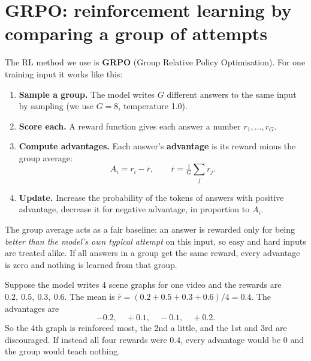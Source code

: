 \documentclass[11pt,openany]{book}
\begin{document}
\section{GRPO: reinforcement learning by comparing a group of attempts}\label{sec:grpo}
The RL method we use is \textbf{GRPO} (Group Relative Policy Optimisation). For one training input it works like this:
\begin{enumerate}
  \item \textbf{Sample a group.} The model writes $G$ different answers to the same input by sampling (we use $G=8$,
  temperature 1.0).
  \item \textbf{Score each.} A reward function gives each answer a number $r_1,\dots,r_G$.
  \item \textbf{Compute advantages.} Each answer's \textbf{advantage} is its reward minus the group average:
  \[ A_i = r_i - \bar r, \qquad \bar r = \tfrac{1}{G}\textstyle\sum_j r_j. \]
  \item \textbf{Update.} Increase the probability of the tokens of answers with positive advantage, decrease it for negative
  advantage, in proportion to $A_i$.
\end{enumerate}
The group average acts as a fair baseline: an answer is rewarded only for being \emph{better than the model's own typical attempt}
on this input, so easy and hard inputs are treated alike. If all answers in a group get the same reward, every advantage is zero
and nothing is learned from that group.

\begin{keyidea}
Suppose the model writes 4 scene graphs for one video and the rewards are $0.2,\ 0.5,\ 0.3,\ 0.6$.
The mean is $\bar r = (0.2+0.5+0.3+0.6)/4 = 0.4$. The advantages are
\[ -0.2,\quad +0.1,\quad -0.1,\quad +0.2. \]
So the 4th graph is reinforced most, the 2nd a little, and the 1st and 3rd are discouraged. If instead all four rewards were 0.4,
every advantage would be 0 and the group would teach nothing.
\end{keyidea}
\end{document}
